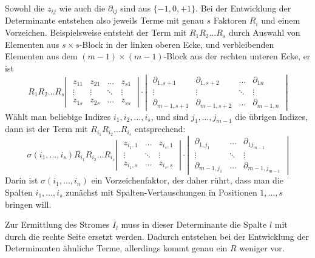 Sowohl die $z_{ij}$ wie auch die $\partial_{ij}$ sind aus $\{-1,0,+1\}$.
Bei der Entwicklung der Determinante entstehen also jeweils Terme
mit genau $s$ Faktoren $R_i$ und einem Vorzeichen.
Beispielsweise entsteht der Term mit $R_1R_2\dots R_s$ durch
Auswahl von Elementen aus $s\times s$-Block in der linken oberen
Ecke, und verbleibenden Elementen aus dem $(m-1)\times (m-1)$-Block
aus der rechten unteren Ecke, er ist
\[
R_1R_2\dots R_s
\left|\;
\begin{matrix}
z_{11}       &z_{21}       &\dots &z_{s1}       \\
\vdots       &\vdots       &\ddots&\vdots       \\
z_{1s}       &z_{2s}       &\dots &z_{ss}       
\end{matrix}
\;\right|
\cdot
\left|\;
\begin{matrix}
\partial_{1,s+1}   &\partial_{1,s+2}   &\dots &\partial_{1n}   \\
\vdots             &\vdots             &\ddots&\vdots          \\
\partial_{m-1,s+1} &\partial_{m-1,s+2} &\dots &\partial_{m-1,n}
\end{matrix}
\;\right|
\]
Wählt man beliebige Indizes $i_1,i_2,\dots,i_s$, und sind $j_1,\dots,j_{m-1}$
die übrigen Indizes, dann ist der
Term mit $R_{i_1}R_{i_2}\dots R_{i_s}$ entsprechend:
\[
\sigma(i_1,\dots,i_s)
R_{i_1}R_{i_2}\dots R_{i_s}
\left|\;
\begin{matrix}
z_{i_1,1}    &\dots &z_{i_s,1}\\
\vdots       &\ddots&\vdots   \\
z_{i_1,s}    &\dots &z_{i_s,s}       
\end{matrix}
\;\right|
\cdot
\left|\;
\begin{matrix}
\partial_{1,j_1}   &\dots &\partial_{1j_{m-1}}   \\
\vdots             &\ddots&\vdots          \\
\partial_{m-1,j_1} &\dots &\partial_{m-1,j_{m-1}}
\end{matrix}
\;\right|
\]
Darin ist $\sigma(i_1,\dots,i_n)$ ein Vorzeichenfaktor, der
daher rührt, dass man die Spalten $i_1,\dots,i_s$ zunächst
mit Spalten-Vertauschungen in Positionen $1,\dots,s$ bringen
will.

Zur Ermittlung des Stromes $I_l$ muss in dieser Determinante die
Spalte $l$ mit durch die rechte Seite ersetzt werden. Dadurch
entstehen bei der Entwicklung der Determinanten ähnliche Terme,
allerdings kommt genau ein $R$ weniger vor.

